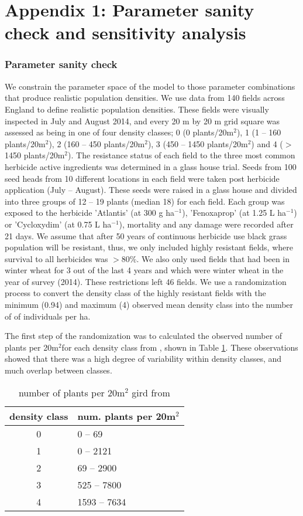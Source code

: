\documentclass[12pt,a4paper]{article}
\begin{document}
\section*{Appendix 1: Parameter sanity check and sensitivity analysis}
\subsubsection*{Parameter sanity check}
We constrain the parameter space of the model to those parameter combinations that produce realistic population densities. We use data from 140 fields across England to define realistic population densities. These fields were visually inspected in July and August 2014, and every 20 m by 20 m grid square was assessed as being in one of four density classes; 0 (0 plants/20m$^2$), 1 (1 -- 160 plants/20m$^2$), 2 (160 -- 450 plants/20m$^2$), 3 (450 -- 1450 plants/20m$^2$) and 4 ($>$1450 plants/20m$^2$). The resistance status of each field to the three most common herbicide active ingredients was determined in a glass house trial. Seeds from 100 seed heads from 10 different locations in each field were taken post herbicide application (July -- August). These seeds were raised in a glass house and divided into three groups of 12 -- 19 plants (median 18) for each field. Each group was exposed to the herbicide 'Atlantis' (at 300 g ha$^{-1}$), 'Fenoxaprop' (at 1.25 L ha$^{-1}$) or 'Cycloxydim' (at 0.75 L ha$^{-1}$), mortality and any damage were recorded after 21 days. We assume that after 50 years of continuous herbicide use black grass population will be resistant, thus, we only included highly resistant fields, where survival to all herbicides was $>80\%$. We also only used fields that had been in winter wheat for 3 out of the last 4 years and which were winter wheat in the year of survey (2014). These restrictions left 46 fields. We use a randomization process to convert the density class of the highly resistant fields with the minimum (0.94) and maximum (4) observed mean density class into the number of of individuals per ha. 

The first step of the randomization was to calculated the observed number of plants per 20m$^2$for each density class from \citealt{Quee2011}, shown in Table \ref{tab:den_lims}. These observations showed that there was a high degree of variability within density classes, and much overlap between classes. 

\begin{table}[h]
	\caption{number of plants per 20m$^2$ gird from \citealt{Quee2011}}
	\label{tab:den_lims}
	\centering
\begin{tabular}{c p{2.5cm}}	\hline
	density class & num. plants per 20m$^2$ \\
	\hline
	0 & 0 -- 69 \\
	1 & 0 -- 2121 \\
	2 & 69 -- 2900 \\
	3 & 525 -- 7800 \\
	4 & 1593 -- 7634 \\
	\hline
\end{tabular}   
\end{table}
\end{document}
